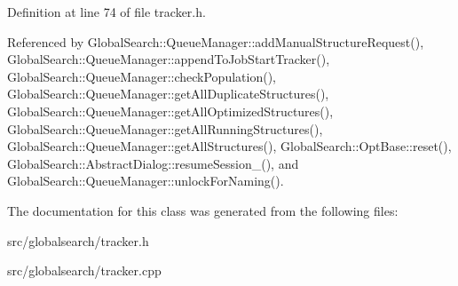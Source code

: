 Definition at line 74 of file tracker.\+h.



Referenced by Global\+Search\+::\+Queue\+Manager\+::add\+Manual\+Structure\+Request(), Global\+Search\+::\+Queue\+Manager\+::append\+To\+Job\+Start\+Tracker(), Global\+Search\+::\+Queue\+Manager\+::check\+Population(), Global\+Search\+::\+Queue\+Manager\+::get\+All\+Duplicate\+Structures(), Global\+Search\+::\+Queue\+Manager\+::get\+All\+Optimized\+Structures(), Global\+Search\+::\+Queue\+Manager\+::get\+All\+Running\+Structures(), Global\+Search\+::\+Queue\+Manager\+::get\+All\+Structures(), Global\+Search\+::\+Opt\+Base\+::reset(), Global\+Search\+::\+Abstract\+Dialog\+::resume\+Session\+\_\+(), and Global\+Search\+::\+Queue\+Manager\+::unlock\+For\+Naming().



The documentation for this class was generated from the following files\+:\begin{DoxyCompactItemize}
\item 
src/globalsearch/tracker.\+h\item 
src/globalsearch/tracker.\+cpp\end{DoxyCompactItemize}
